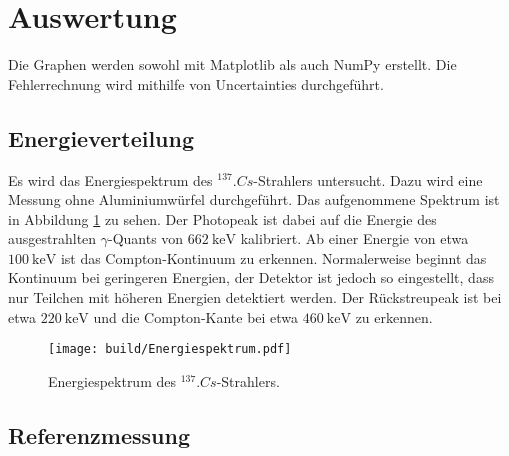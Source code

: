 \section{Auswertung}
\label{sec:Auswertung}

Die Graphen werden sowohl mit Matplotlib \cite{matplotlib} als auch NumPy \cite{numpy} erstellt. Die Fehlerrechnung wird mithilfe von Uncertainties \cite{uncertainties} durchgeführt.

\subsection{Energieverteilung}

Es wird das Energiespektrum des $^{137}.{Cs}$-Strahlers untersucht. Dazu wird eine Messung ohne Aluminiumwürfel durchgeführt. Das aufgenommene Spektrum ist in Abbildung \ref{fig:energiespektrum} zu sehen. Der Photopeak ist dabei auf die Energie des ausgestrahlten $\gamma$-Quants von $\SI{662}{\kilo\electronvolt}$ kalibriert. Ab einer Energie von etwa $\SI{100}{\kilo\electronvolt}$ ist das Compton-Kontinuum zu erkennen. Normalerweise beginnt das Kontinuum bei geringeren Energien, der Detektor ist jedoch so eingestellt, dass nur Teilchen mit höheren Energien detektiert werden. Der Rückstreupeak ist bei etwa $\SI{220}{\kilo\electronvolt}$ und die Compton-Kante bei etwa $\SI{460}{\kilo\electronvolt}$ zu erkennen.

\begin{figure}
\centering
\texttt{[image: build/Energiespektrum.pdf]}
\caption{Energiespektrum des $^{137}.{Cs}$-Strahlers.}
\label{fig:energiespektrum}
\end{figure}

\subsection{Referenzmessung}

